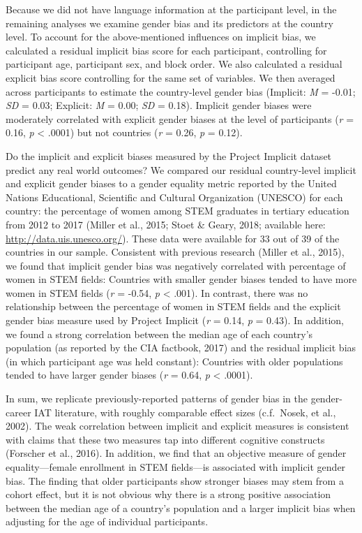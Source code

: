 \documentclass[man,floatsintext]{apa6}
\begin{document}
Because we did not have language information at the participant level, in the remaining analyses we examine gender bias and its predictors at the country level. To account for the above-mentioned influences on implicit bias, we calculated a residual implicit bias score for each participant, controlling for participant age, participant sex, and block order. We also calculated a residual explicit bias score controlling for the same set of variables. We then averaged across participants to estimate the country-level gender bias (Implicit: \emph{M} = -0.01; \emph{SD} = 0.03; Explicit: \emph{M} = 0.00; \emph{SD} = 0.18). Implicit gender biases were moderately correlated with explicit gender biases at the level of participants (\emph{r} = 0.16, \emph{p} \textless{} .0001) but not countries (\emph{r} = 0.26, \emph{p} = 0.12).

Do the implicit and explicit biases measured by the Project Implicit dataset predict any real world outcomes? We compared our residual country-level implicit and explicit gender biases to a gender equality metric reported by the United Nations Educational, Scientific and Cultural Organization (UNESCO) for each country: the percentage of women among STEM graduates in tertiary education from 2012 to 2017 (Miller et al., 2015; Stoet \& Geary, 2018; available here: \url{http://data.uis.unesco.org/}). These data were available for 33 out of 39 of the countries in our sample. Consistent with previous research (Miller et al., 2015), we found that implicit gender bias was negatively correlated with percentage of women in STEM fields: Countries with smaller gender biases tended to have more women in STEM fields (\emph{r} = -0.54, \emph{p} \textless{} .001). In contrast, there was no relationship between the percentage of women in STEM fields and the explicit gender bias measure used by Project Implicit (\emph{r} = 0.14, \emph{p} = 0.43). In addition, we found a strong correlation between the median age of each country's population (as reported by the CIA factbook, 2017) and the residual implicit bias (in which participant age was held constant): Countries with older populations tended to have larger gender biases (\emph{r} = 0.64, \emph{p} \textless{} .0001).

In sum, we replicate previously-reported patterns of gender bias in the gender-career IAT literature, with roughly comparable effect sizes (c.f.~Nosek, et al., 2002). The weak correlation between implicit and explicit measures is consistent with claims that these two measures tap into different cognitive constructs (Forscher et al., 2016). In addition, we find that an objective measure of gender equality---female enrollment in STEM fields---is associated with implicit gender bias. The finding that older participants show stronger biases may stem from a cohort effect, but it is not obvious why there is a strong positive association between the median age of a country's population and a larger implicit bias when adjusting for the age of individual participants.
\end{document}
